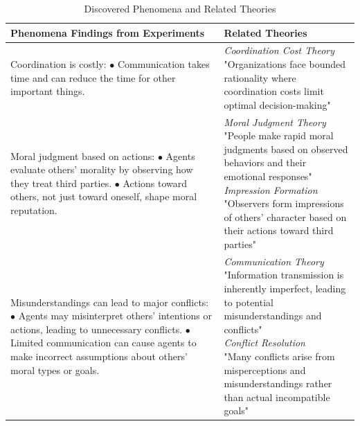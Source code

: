 \begin{table}[tbp]
\centering
\caption{Discovered Phenomena and Related Theories}
\label{tab:project_findings}
\small
\setlength{\tabcolsep}{4pt}
\begin{tabular}{p{7cm}p{7cm}}
\hline
\textbf{Phenomena Findings from Experiments} & \textbf{Related Theories} \\
\hline
\parbox[t]{7cm}{Coordination is costly: \\ 
\hspace*{1em} $\bullet$ Communication takes time and can reduce the time for other important things.} & 
\parbox[t]{7cm}{\textit{Coordination Cost Theory} \citep{simon1991bounded} \\
"Organizations face bounded rationality where coordination costs limit optimal decision-making"} \\
\hline
\parbox[t]{7cm}{Moral judgment based on actions: \\
\hspace*{1em} $\bullet$ Agents evaluate others' morality by observing how they treat third parties. \\
\hspace*{1em} $\bullet$ Actions toward others, not just toward oneself, shape moral reputation.} & 
\parbox[t]{7cm}{\textit{Moral Judgment Theory} \citep{haidt2001emotional} \\
"People make rapid moral judgments based on observed behaviors and their emotional responses" \\
\textit{Impression Formation} \citep{asch1946forming} \\
"Observers form impressions of others' character based on their actions toward third parties"} \\
\hline

\parbox[t]{7cm}{Misunderstandings can lead to major conflicts: \\
\hspace*{1em} $\bullet$ Agents may misinterpret others' intentions or actions, leading to unnecessary conflicts. \\
\hspace*{1em} $\bullet$ Limited communication can cause agents to make incorrect assumptions about others' moral types or goals.} & 
\parbox[t]{7cm}{\textit{Communication Theory} \citep{shannon1948mathematical} \\
"Information transmission is inherently imperfect, leading to potential misunderstandings and conflicts" \\
\textit{Conflict Resolution} \citep{deutsch1973resolution} \\
"Many conflicts arise from misperceptions and misunderstandings rather than actual incompatible goals"} \\
\hline


\end{tabular}
\end{table}
